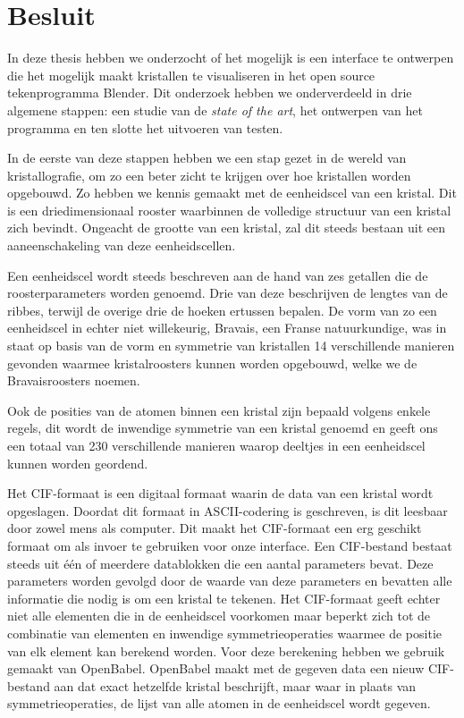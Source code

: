 

\chapter{Besluit}  

In deze thesis hebben we onderzocht of het mogelijk is een interface te ontwerpen die het mogelijk maakt kristallen te visualiseren in het open source tekenprogramma Blender. Dit onderzoek hebben we onderverdeeld in drie algemene stappen: een studie van de \textit{state of the art}, het ontwerpen van het programma en ten slotte het uitvoeren van testen.
\par
In de eerste van deze stappen hebben we een stap gezet in de wereld van kristallografie, om zo een beter zicht te krijgen over hoe kristallen worden opgebouwd. Zo hebben we kennis gemaakt met de eenheidscel van een kristal. Dit is een driedimensionaal rooster waarbinnen de volledige structuur van een kristal zich bevindt. Ongeacht de grootte van een kristal, zal dit steeds bestaan uit een aaneenschakeling van deze eenheidscellen. 
\par
Een eenheidscel wordt steeds beschreven aan de hand van zes getallen die de roosterparameters worden genoemd. Drie van deze beschrijven de lengtes van de ribbes, terwijl de overige drie de hoeken ertussen bepalen. De vorm van zo een eenheidscel in echter niet willekeurig, Bravais, een Franse natuurkundige, was in staat op basis van de vorm en symmetrie van kristallen 14 verschillende manieren gevonden waarmee kristalroosters kunnen worden opgebouwd, welke we de Bravaisroosters noemen.
\par
Ook de posities van de atomen binnen een kristal zijn bepaald volgens enkele regels, dit wordt de inwendige symmetrie van een kristal genoemd en geeft ons een totaal van 230 verschillende manieren waarop deeltjes in een eenheidscel kunnen worden geordend.
\par
Het CIF-formaat is een digitaal formaat waarin de data van een kristal wordt opgeslagen. Doordat dit formaat in ASCII-codering is geschreven, is dit leesbaar door zowel mens als computer. Dit maakt het CIF-formaat een erg geschikt formaat om als invoer te gebruiken voor onze interface. Een CIF-bestand bestaat steeds uit één of meerdere datablokken die een aantal parameters bevat. Deze parameters worden gevolgd door de waarde van deze parameters en bevatten alle informatie die nodig is om een kristal te tekenen. Het CIF-formaat geeft echter niet alle elementen die in de eenheidscel voorkomen maar beperkt zich tot de combinatie van elementen en inwendige symmetrieoperaties waarmee de positie van elk element kan berekend worden. Voor deze berekening hebben we gebruik gemaakt van OpenBabel. OpenBabel maakt met de gegeven data een nieuw CIF-bestand aan dat exact hetzelfde kristal beschrijft, maar waar in plaats van symmetrieoperaties, de lijst van alle atomen in de eenheidscel wordt gegeven. 
